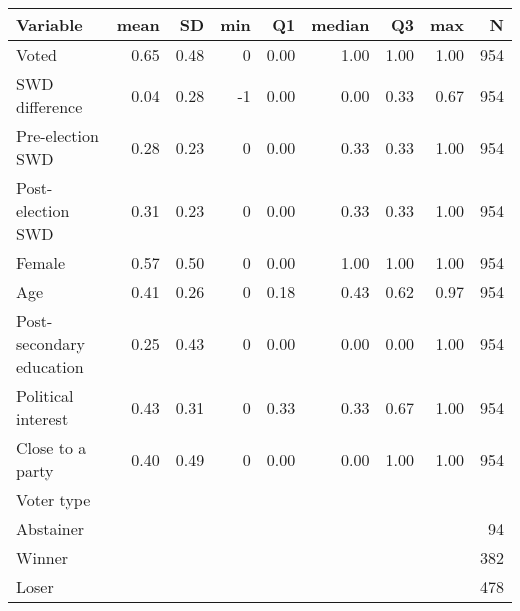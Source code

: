 
\begin{tabular}{l|r|r|r|r|r|r|r|r}
\hline
Variable & mean & SD & min & Q1 & median & Q3 & max & N\\
\hline
Voted & 0.65 & 0.48 & 0 & 0.00 & 1.00 & 1.00 & 1.00 & 954\\
\hline
SWD difference & 0.04 & 0.28 & -1 & 0.00 & 0.00 & 0.33 & 0.67 & 954\\
\hline
Pre-election SWD & 0.28 & 0.23 & 0 & 0.00 & 0.33 & 0.33 & 1.00 & 954\\
\hline
Post-election SWD & 0.31 & 0.23 & 0 & 0.00 & 0.33 & 0.33 & 1.00 & 954\\
\hline
Female & 0.57 & 0.50 & 0 & 0.00 & 1.00 & 1.00 & 1.00 & 954\\
\hline
Age & 0.41 & 0.26 & 0 & 0.18 & 0.43 & 0.62 & 0.97 & 954\\
\hline
Post-secondary education & 0.25 & 0.43 & 0 & 0.00 & 0.00 & 0.00 & 1.00 & 954\\
\hline
Political interest & 0.43 & 0.31 & 0 & 0.33 & 0.33 & 0.67 & 1.00 & 954\\
\hline
Close to a party & 0.40 & 0.49 & 0 & 0.00 & 0.00 & 1.00 & 1.00 & 954\\
\hline
Voter type &  &  &  &  &  &  &  & \\
\hline
Abstainer &  &  &  &  &  &  &  & 94\\
\hline
Winner &  &  &  &  &  &  &  & 382\\
\hline
Loser &  &  &  &  &  &  &  & 478\\
\hline
\end{tabular}
